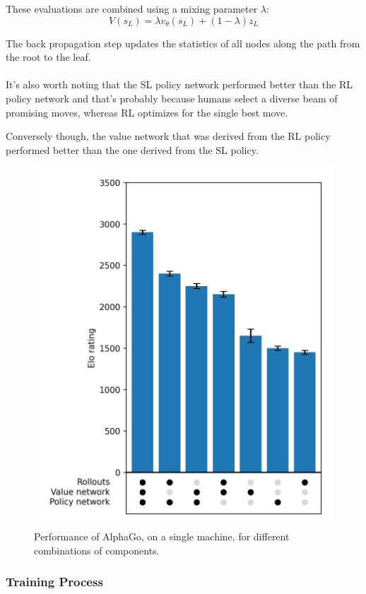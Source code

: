 These evaluations are combined using a mixing parameter \( \lambda \):
\begin{equation}
    V(s_L) = \lambda v_\theta(s_L) + (1 - \lambda) z_L
\end{equation}

The back propagation step updates the statistics of all nodes along the path
from the root to the leaf. \\\\ It's also worth noting that the SL policy
network performed better than the RL policy network and that's probably because
humans select a diverse beam of promising moves, whereas RL optimizes for the
single best move.

Conversely though, the value network that was derived from the RL policy
performed better than the one derived from the SL policy.
\begin{figure}[htbp]
    \centering
    \includegraphics[height=1.0\linewidth, keepaspectratio]{sections/4AlphaGo/innovation.png}
    \caption{Performance of AlphaGo, on a single machine, for different
combinations of components.}
\end{figure}

\subsubsection{Training Process}

